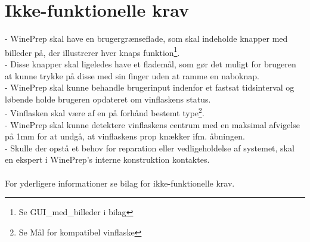 \section{Ikke-funktionelle krav}
- WinePrep skal have en brugergrænseflade, som skal indeholde knapper med billeder på, der illustrerer hver knaps funktion\footnote{Se GUI\_med\_billeder i bilag}. \\
- Disse knapper skal ligeledes have et flademål, som gør det muligt for brugeren at kunne trykke på disse med sin finger uden at ramme en naboknap. \\
- WinePrep skal kunne behandle brugerinput indenfor et fastsat tidsinterval og løbende holde brugeren opdateret om vinflaskens status. \\
- Vinflasken skal være af en på forhånd bestemt type\footnote{Se Mål for kompatibel vinflaske}. \\
- WinePrep skal kunne detektere vinflaskens centrum med en maksimal afvigelse på 1mm for at undgå, at vinflaskens prop knækker ifm. åbningen. \\
- Skulle der opstå et behov for reparation eller vedligeholdelse af systemet, skal en ekspert i WinePrep's interne konstruktion kontaktes. \\
\\
For yderligere informationer se bilag for ikke-funktionelle krav.